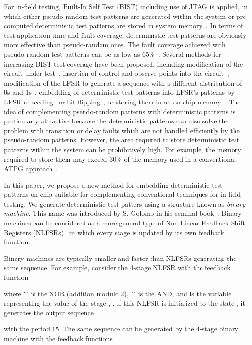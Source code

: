 \documentclass[10pt,conference]{IEEEtran}
\begin{document}
For in-field testing, Built-In Self Test (BIST) including use of JTAG 
is applied, in which either pseudo-random test patterns are generated 
within the system or pre-computed deterministic test patterns are stored 
in system memory~\cite{MaA10}.  
In terms of test application
time and fault coverage, deterministic test patterns are obviously more effective 
than pseudo-random ones. The fault coverage achieved with  pseudo-random test patterns
can be as low as 65\%~\cite{DaT00}. 
Several methods for increasing BIST test coverage have been proposed, including modification of the circuit under test~\cite{EiL83}, insertion of control and observe points into the circuit~\cite{RaTKM04}, modification of the LFSR to generate a
sequence with a different distribution of 0s and 1s~\cite{ChM84},
embedding of deterministic test patterns into LFSR's patterns by 
LFSR re-seeding~\cite{Jer08} or bit-flipping~\cite{WuK96}, or storing 
them in an on-chip memory~\cite{SaDB84}. The idea of complementing pseudo-random patterns with deterministic patterns 
is particularly attractive because the deterministic patterns can also solve 
the problem with transition or delay faults which are not handled efficiently by the
pseudo-random patterns. 
However, the area required to store deterministic test patterns
within the system can be prohibitively high.
For example, the memory required to store them may exceed 30\% of the memory used in a conventional ATPG approach~\cite{HeF99}.



In this paper, we propose a new method for embedding deterministic test patterns
on-chip suitable for complementing conventional techniques for in-field testing. 
We generate deterministic test patters using a structure known as {\em binary machine}. This name was introduced by S. Golomb in his seminal book~\cite{Golomb_book}.
Binary machines can be considered as a more general type of 
Non-Linear Feedback Shift Registers (NLFSRs)~\cite{Ja89}
in which every stage is updated by its own feedback function. 

Binary machines are typically smaller and
faster than NLFSRs generating the same sequence. 
For example, consider the 4-stage NLFSR with the feedback function 

where "" is the XOR (addition modulo 2), "" is the AND,
and  is the variable representing the value of the stage , 
.
If this NLFSR is initialized to the state , it 
generates the output sequence 

with the period 15.
The same sequence can be generated by the 4-stage binary machine with the 
feedback functions
\end{document}

